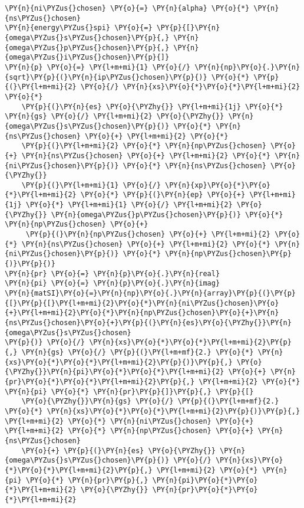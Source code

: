\begin{Verbatim}[commandchars=\\\{\}]
\PY{n}{ni\PYZus{}chosen} \PY{o}{=} \PY{n}{alpha} \PY{o}{*} \PY{n}{ns\PYZus{}chosen}
\PY{n}{energy\PYZus{}spi} \PY{o}{=} \PY{p}{[}\PY{n}{omega\PYZus{}s\PYZus{}chosen}\PY{p}{,} \PY{n}{omega\PYZus{}p\PYZus{}chosen}\PY{p}{,} \PY{n}{omega\PYZus{}i\PYZus{}chosen}\PY{p}{]}
\PY{n}{p} \PY{o}{=} \PY{l+m+mi}{1} \PY{o}{/} \PY{n}{np}\PY{o}{.}\PY{n}{sqrt}\PY{p}{(}\PY{n}{ip\PYZus{}chosen}\PY{p}{)} \PY{o}{*} \PY{p}{(}\PY{l+m+mi}{2} \PY{o}{/} \PY{n}{xs}\PY{o}{*}\PY{o}{*}\PY{l+m+mi}{2} \PY{o}{*}
    \PY{p}{(}\PY{n}{es} \PY{o}{\PYZhy{}} \PY{l+m+mi}{1j} \PY{o}{*} \PY{n}{gs} \PY{o}{/} \PY{l+m+mi}{2} \PY{o}{\PYZhy{}} \PY{n}{omega\PYZus{}s\PYZus{}chosen}\PY{p}{)} \PY{o}{*} \PY{n}{ns\PYZus{}chosen} \PY{o}{+} \PY{l+m+mi}{2} \PY{o}{*}
    \PY{p}{(}\PY{l+m+mi}{2} \PY{o}{*} \PY{n}{np\PYZus{}chosen} \PY{o}{+} \PY{n}{ns\PYZus{}chosen} \PY{o}{+} \PY{l+m+mi}{2} \PY{o}{*} \PY{n}{ni\PYZus{}chosen}\PY{p}{)} \PY{o}{*} \PY{n}{ns\PYZus{}chosen} \PY{o}{\PYZhy{}}
    \PY{p}{(}\PY{l+m+mi}{1} \PY{o}{/} \PY{n}{xp}\PY{o}{*}\PY{o}{*}\PY{l+m+mi}{2} \PY{o}{*} \PY{p}{(}\PY{n}{ep} \PY{o}{+} \PY{l+m+mi}{1j} \PY{o}{*} \PY{l+m+mi}{1} \PY{o}{/} \PY{l+m+mi}{2} \PY{o}{\PYZhy{}} \PY{n}{omega\PYZus{}p\PYZus{}chosen}\PY{p}{)} \PY{o}{*} \PY{n}{np\PYZus{}chosen} \PY{o}{+}
     \PY{p}{(}\PY{n}{np\PYZus{}chosen} \PY{o}{+} \PY{l+m+mi}{2} \PY{o}{*} \PY{n}{ns\PYZus{}chosen} \PY{o}{+} \PY{l+m+mi}{2} \PY{o}{*} \PY{n}{ni\PYZus{}chosen}\PY{p}{)} \PY{o}{*} \PY{n}{np\PYZus{}chosen}\PY{p}{)}\PY{p}{)}
\PY{n}{pr} \PY{o}{=} \PY{n}{p}\PY{o}{.}\PY{n}{real}
\PY{n}{pi} \PY{o}{=} \PY{n}{p}\PY{o}{.}\PY{n}{imag}
\PY{n}{matSI}\PY{o}{=}\PY{n}{np}\PY{o}{.}\PY{n}{array}\PY{p}{(}\PY{p}{[}\PY{p}{[}\PY{l+m+mi}{2}\PY{o}{*}\PY{n}{ni\PYZus{}chosen}\PY{o}{+}\PY{l+m+mi}{2}\PY{o}{*}\PY{n}{np\PYZus{}chosen}\PY{o}{+}\PY{n}{ns\PYZus{}chosen}\PY{o}{+}\PY{p}{(}\PY{n}{es}\PY{o}{\PYZhy{}}\PY{n}{omega\PYZus{}s\PYZus{}chosen}
\PY{p}{)} \PY{o}{/} \PY{n}{xs}\PY{o}{*}\PY{o}{*}\PY{l+m+mi}{2}\PY{p}{,} \PY{n}{gs} \PY{o}{/} \PY{p}{(}\PY{l+m+mf}{2.} \PY{o}{*} \PY{n}{xs}\PY{o}{*}\PY{o}{*}\PY{l+m+mi}{2}\PY{p}{)}\PY{p}{,} \PY{o}{\PYZhy{}}\PY{n}{pi}\PY{o}{*}\PY{o}{*}\PY{l+m+mi}{2} \PY{o}{+} \PY{n}{pr}\PY{o}{*}\PY{o}{*}\PY{l+m+mi}{2}\PY{p}{,} \PY{l+m+mi}{2} \PY{o}{*} \PY{n}{pi} \PY{o}{*} \PY{n}{pr}\PY{p}{]}\PY{p}{,} \PY{p}{[}
    \PY{o}{\PYZhy{}}\PY{n}{gs} \PY{o}{/} \PY{p}{(}\PY{l+m+mf}{2.} \PY{o}{*} \PY{n}{xs}\PY{o}{*}\PY{o}{*}\PY{l+m+mi}{2}\PY{p}{)}\PY{p}{,} \PY{l+m+mi}{2} \PY{o}{*} \PY{n}{ni\PYZus{}chosen} \PY{o}{+} \PY{l+m+mi}{2} \PY{o}{*} \PY{n}{np\PYZus{}chosen} \PY{o}{+} \PY{n}{ns\PYZus{}chosen}
    \PY{o}{+} \PY{p}{(}\PY{n}{es} \PY{o}{\PYZhy{}} \PY{n}{omega\PYZus{}s\PYZus{}chosen}\PY{p}{)} \PY{o}{/} \PY{n}{xs}\PY{o}{*}\PY{o}{*}\PY{l+m+mi}{2}\PY{p}{,} \PY{l+m+mi}{2} \PY{o}{*} \PY{n}{pi} \PY{o}{*} \PY{n}{pr}\PY{p}{,} \PY{n}{pi}\PY{o}{*}\PY{o}{*}\PY{l+m+mi}{2} \PY{o}{\PYZhy{}} \PY{n}{pr}\PY{o}{*}\PY{o}{*}\PY{l+m+mi}{2}

\end{Verbatim}
